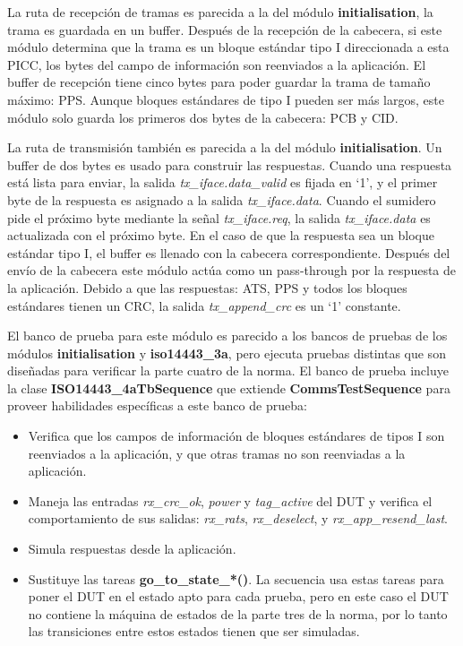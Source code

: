 \documentclass[a4paper, twoside, 11pt]{report}
\begin{document}
La ruta de recepción de tramas es parecida a la del módulo \textbf{initialisation}, la trama es guardada en un buffer. Después de la recepción de la cabecera, si este módulo determina que la trama es un bloque estándar tipo I direccionada a esta PICC, los bytes del campo de información son reenviados a la aplicación. El buffer de recepción tiene cinco bytes para poder guardar la trama de tamaño máximo: PPS. Aunque bloques estándares de tipo I pueden ser más largos, este módulo solo guarda los primeros dos bytes de la cabecera: PCB y CID.

La ruta de transmisión también es parecida a la del módulo \textbf{initialisation}. Un buffer de dos bytes es usado para construir las respuestas. Cuando una respuesta está lista para enviar, la salida \textit{tx\_iface.data\_valid} es fijada en ‘1’, y el primer byte de la respuesta es asignado a la salida \textit{tx\_iface.data}. Cuando el sumidero pide el próximo byte mediante la señal \textit{tx\_iface.req}, la salida \textit{tx\_iface.data} es actualizada con el próximo byte. En el caso de que la respuesta sea un bloque estándar tipo I, el buffer es llenado con la cabecera correspondiente. Después del envío de la cabecera este módulo actúa como un pass-through por la respuesta de la aplicación. Debido a que las respuestas: ATS, PPS y todos los bloques estándares tienen un CRC, la salida \textit{tx\_append\_crc} es un ‘1’ constante.

El banco de prueba para este módulo es parecido a los bancos de pruebas de los módulos \textbf{initialisation} y \textbf{iso14443\_3a}, pero ejecuta pruebas distintas que son diseñadas para verificar la parte cuatro de la norma. El banco de prueba incluye la clase \textbf{ISO14443\_4a\-TbSequence} que extiende \textbf{CommsTestSequence} para proveer habilidades específicas a este banco de prueba:

\begin{itemize}
  \item Verifica que los campos de información de bloques estándares de tipos I son reenviados a la aplicación, y que otras tramas no son reenviadas a la aplicación.
  \item Maneja las entradas \textit{rx\_crc\_ok}, \textit{power} y \textit{tag\_active} del DUT y verifica el comportamiento de sus salidas: \textit{rx\_rats}, \textit{rx\_deselect}, y \textit{rx\_app\_resend\_last}.
  \item Simula respuestas desde la aplicación.
  \item Sustituye las tareas \textbf{go\_to\_state\_*()}. La secuencia usa estas tareas para poner el DUT en el estado apto para cada prueba, pero en este caso el DUT no contiene la máquina de estados de la parte tres de la norma, por lo tanto las transiciones entre estos estados tienen que ser simuladas.
\end{itemize}
\end{document}
